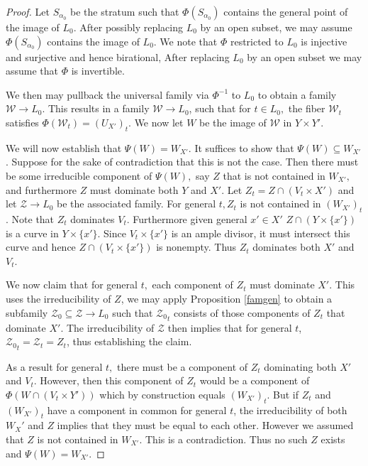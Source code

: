 \documentclass[10pt,a4paper]{amsart}
\begin{document}
\begin{proof}
Let $S_{\alpha_0}$ be the stratum such that $\Phi(S_{\alpha_0})$ contains the general point of the image of $L_0$. After possibly replacing $L_0$ by an open subset, we may assume $\Phi(S_{\alpha_0})$ contains the image of $L_0$.  We note that $\Phi$ restricted to $L_0$ is injective and surjective  and hence birational, After replacing $L_0$ by an open subset we may assume that $\Phi$ is invertible.

We then may pullback the universal family via $\Phi^{-1}$ to $L_0$ to obtain a family $\mathcal{W} \to L_0$.   This results in a family $\mathcal{W} \to L_0$, such that for $t \in L_0,$ the fiber $\mathcal{W}_t$ satisfies $\Phi(\mathcal{W}_t) = (U_{X'})_t$. We now let $W$ be the image of $\mathcal{W}$ in $Y \times Y'$.    


 We will now establish that $\Psi(W) = W_{X'}$. It suffices to show that $\Psi(W) \subseteq W_{X'}$. Suppose for the sake of contradiction that this is not the case. Then there must be some irreducible component of $\Psi(W),$ say $Z$ that is not contained in $W_{X'},$ and furthermore $Z$ must dominate both $Y$ and $X'$.
 Let $Z_t = Z \cap (V_t \times X')$ and let $\mathcal{Z} \to L_0$ be the associated family. For general $t, Z_t$ is not contained in $(W_{X'})_t$. Note that $Z_t$ dominates $V_t$. Furthermore  given general $x' \in X'$ $Z \cap (Y \times \{x'\})$ is a curve in $Y \times \{x'\}$. Since $V_t \times \{x'\}$ is an ample divisor, it must intersect this curve and hence $Z \cap (V_t \times \{x'\})$ is nonempty. Thus $Z_t$ dominates both $X'$ and $V_t$.

 We now claim that for general $t,$ each component of $Z_t$ must dominate $X'$. This uses the irreducibility of $Z$, we may apply Proposition \ref{famgen} to obtain a subfamily $\mathcal{Z}_0 \subseteq \mathcal{Z} \to L_0$ such that $\mathcal{Z_0}_t$ consists of those components of $Z_t$ that dominate $X'$. The irreducibility of $\mathcal{Z}$ then implies that for general $t$, $\mathcal{Z_0}_t = \mathcal{Z}_t = Z_t$, thus establishing the claim.

 As a result for general $t,$ there must be a component of $Z_t$ dominating both $X'$ and $V_t.$ However, then this component of $Z_t$ would be a component of $\Phi(W \cap  (V_t \times Y'))$ which by construction equals $ (W_{X'})_t$. But if $Z_t$ and  $(W_{X'})_t$ have a component in common for general $t$, the irreducibility of both $W_X'$ and $Z$ implies that they must be equal to each other. However we assumed that $Z$ is not contained in $W_{X'}.$ This is a contradiction. Thus no such $Z$ exists and $\Psi(W) = W_{X'}.$
 

 

    \end{proof}
\end{document}

